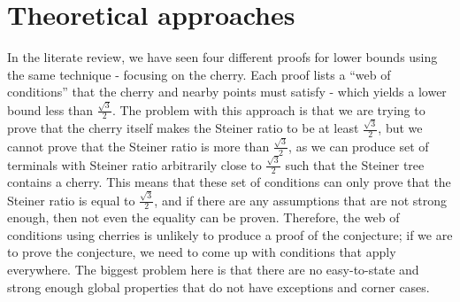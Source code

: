 \documentclass{mpaper}
\begin{document}

\section{Theoretical approaches}

In the literate review, we have seen four different proofs for lower bounds using the same technique - focusing on the cherry. Each proof lists a ``web of conditions'' that the cherry and nearby points must satisfy - which yields a lower bound less than $\frac{\sqrt{3}}{2}$. The problem with this approach is that we are trying to prove that the cherry itself makes the Steiner ratio to be at least $\frac{\sqrt{3}}{2}$, but we cannot prove that the Steiner ratio is more than  $\frac{\sqrt{3}}{2}$, as we can produce set of terminals with Steiner ratio arbitrarily close to $\frac{\sqrt{3}}{2}$ such that the Steiner tree contains a cherry. This means that  these set of conditions can only prove that the Steiner ratio is equal to  $\frac{\sqrt{3}}{2}$, and if there are any assumptions that are not strong enough, then not even the equality can be proven. Therefore, the web of conditions using cherries is unlikely to produce a proof of the conjecture; if we are to prove the conjecture, we need to come up with conditions that apply everywhere. The biggest problem here is that there are no easy-to-state and strong enough global properties that do not have exceptions and corner cases.
\end{document}
